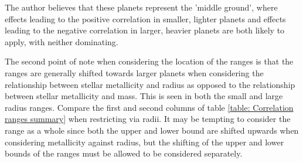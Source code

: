 \documentclass[a4paper,twocolumn,12pt]{article}
\begin{document}
The author believes that these planets represent the 'middle ground', where effects leading to the positive correlation in smaller, lighter planets and effects leading to the negative correlation in larger, heavier planets are both likely to apply, with neither dominating.


The second point of note when considering the location of the ranges is that the ranges are generally shifted towards larger 
planets when considering the relationship between stellar metallicity and radius as opposed to the relationship between stellar metallicity and mass. This is seen in both the small and large radius ranges. Compare the first and second columns of table \ref{table: Correlation ranges summary} when restricting via radii.
It may be tempting to consider the range as a whole since both the upper and lower bound are shifted upwards when considering metallicity against radius, but the shifting of the upper and lower bounds of the ranges must be allowed to be considered separately.







\end{document}
